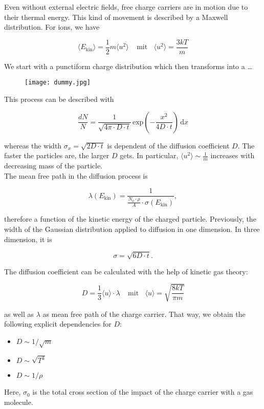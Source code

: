 Even without external electric fields, free charge carriers are in motion due to their thermal
energy. This kind of movement is described by a Maxwell distribution. For ions, we have

\[\langle E_{\text{kin}} \rangle = \frac{1}{2} m \langle u^2 \rangle ~~~~~\text{mit}~~~~ \langle u^2
\rangle = \frac{3kT}{m}
\]

We start with a punctiform charge distribution which then transforms into a \ldots

\begin{figure}[H]
	\centering
	\texttt{[image: dummy.jpg]}
\end{figure}

This process can be described with 

\[\frac{dN}{N} = \frac{1}{\sqrt{4\pi\cdot D\cdot t}}\, \text{exp}\left(-\frac{x^2}{4D\cdot
t}\right)\,\mathrm{d}x
\]

whereas the width $\sigma_x=\sqrt{2D\cdot t}$ is dependent of the diffusion coefficient $D$. The
faster the particles are, the larger $D$ gets. In particular, $\langle u^2 \rangle \sim
\frac{1}{m}$ increases with decreasing mass of the particle.
\\
The mean free path in the diffusion process is

\[\lambda(E_{\text{kin}}) = \frac{1}{\frac{N_0\cdot\rho}{A}\cdot \sigma(E_{\text{kin}})}, \]

therefore a function of the kinetic energy of the charged particle.
Previously, the width of the Gaussian distribution applied to diffusion in one dimension. In three
dimension, it is

\[\sigma = \sqrt{6D\cdot t} . \]

The diffusion coefficient can be calculated with the help of kinetic gas theory:

\[D=\frac{1}{3} \langle u \rangle \cdot \lambda~~~~~\text{mit}~~~~\langle u \rangle
=\sqrt{\frac{8kT}{\pi m}}\]

as well as $\lambda$ as mean free path of the charge carrier. That way, we obtain the following
explicit dependencies for $D$:

\begin{itemize}
  \item $D\sim 1/\sqrt{m}$
  \item $D\sim \sqrt{T^3}$
  \item $D\sim 1/\rho$
\end{itemize}

Here, $\sigma_0$ is the total cross section of the impact of the charge carrier with a gas molecule.
